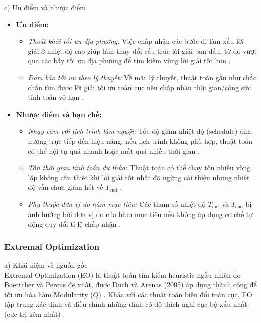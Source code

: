 \documentclass[14pt,a4paper]{extarticle}
\begin{document}
\noindent c) Ưu điểm và nhược điểm
\begin{itemize}
    \item \textbf{Ưu điểm:}
    \begin{itemize}
        \item \textit{Thoát khỏi tối ưu địa phương:} Việc chấp nhận các bước đi làm xấu lời giải ở nhiệt độ cao giúp làm thay đổi cấu trúc lời giải ban đầu, từ đó vượt qua các bẫy tối ưu địa phương để tìm kiếm vùng lời giải tốt hơn \cite{Taillard2023, Luke2009}.
        \item \textit{Đảm bảo tối ưu theo lý thuyết:} Về mặt lý thuyết, thuật toán gần như chắc chắn tìm được lời giải tối ưu toàn cục nếu chấp nhận thời gian/công sức tính toán vô hạn \cite{Taillard2023}.
    \end{itemize}
    \item \textbf{Nhược điểm và hạn chế:}
    \begin{itemize}
        \item \textit{Nhạy cảm với lịch trình làm nguội:} Tốc độ giảm nhiệt độ (schedule) ảnh hưởng trực tiếp đến hiệu năng; nếu lịch trình không phù hợp, thuật toán có thể hội tụ quá nhanh hoặc mất quá nhiều thời gian \cite{Luke2009}.
        \item \textit{Tốn thời gian tính toán dư thừa:} Thuật toán có thể chạy tốn nhiều vòng lặp không cần thiết khi lời giải tốt nhất đã ngừng cải thiện nhưng nhiệt độ vẫn chưa giảm hết về $T_{\text{end}}$ \cite{Taillard2023}.
        \item \textit{Phụ thuộc đơn vị đo hàm mục tiêu:} Các tham số nhiệt độ $T_{\text{init}}$ và $T_{\text{end}}$ bị ảnh hưởng bởi đơn vị đo của hàm mục tiêu nếu không áp dụng cơ chế tự động quy đổi tỉ lệ chấp nhận \cite{Taillard2023}.
    \end{itemize}
\end{itemize}

\subsubsection{Extremal Optimization}
\noindent a) Khái niệm và nguồn gốc
\\ \indent
Extremal Optimization (EO) là thuật toán tìm kiếm heuristic ngẫu nhiên do Boettcher và Percus đề xuất, được Duch và Arenas (2005) áp dụng thành công để tối ưu hóa hàm Modularity ($Q$) \cite{Fortunato2010, Beldi2025}. Khác với các thuật toán biến đổi toàn cục, EO tập trung xác định và điều chỉnh những đỉnh có độ thích nghi cục bộ xấu nhất (cực trị kém nhất) \cite{Fortunato2010}.
\end{document}
